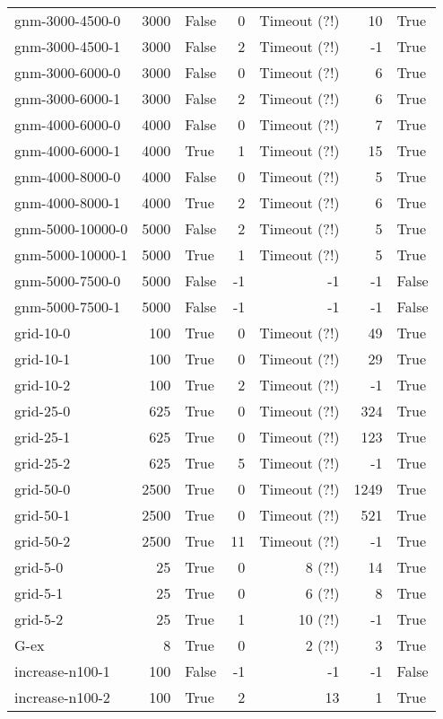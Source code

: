 \begin{longtable}{lrlrrrl}
gnm-3000-4500-0 & 3000 & False & 0 & Timeout (?!) & 10 & True \\
gnm-3000-4500-1 & 3000 & False & 2 & Timeout (?!) & -1 & True \\
gnm-3000-6000-0 & 3000 & False & 0 & Timeout (?!) & 6 & True \\
gnm-3000-6000-1 & 3000 & False & 2 & Timeout (?!) & 6 & True \\
gnm-4000-6000-0 & 4000 & False & 0 & Timeout (?!) & 7 & True \\
gnm-4000-6000-1 & 4000 & True & 1 & Timeout (?!) & 15 & True \\
gnm-4000-8000-0 & 4000 & False & 0 & Timeout (?!) & 5 & True \\
gnm-4000-8000-1 & 4000 & True & 2 & Timeout (?!) & 6 & True \\
gnm-5000-10000-0 & 5000 & False & 2 & Timeout (?!) & 5 & True \\
gnm-5000-10000-1 & 5000 & True & 1 & Timeout (?!) & 5 & True \\
gnm-5000-7500-0 & 5000 & False & -1 & -1 & -1 & False \\
gnm-5000-7500-1 & 5000 & False & -1 & -1 & -1 & False \\
grid-10-0 & 100 & True & 0 & Timeout (?!) & 49 & True \\
grid-10-1 & 100 & True & 0 & Timeout (?!) & 29 & True \\
grid-10-2 & 100 & True & 2 & Timeout (?!) & -1 & True \\
grid-25-0 & 625 & True & 0 & Timeout (?!) & 324 & True \\
grid-25-1 & 625 & True & 0 & Timeout (?!) & 123 & True \\
grid-25-2 & 625 & True & 5 & Timeout (?!) & -1 & True \\
grid-50-0 & 2500 & True & 0 & Timeout (?!) & 1249 & True \\
grid-50-1 & 2500 & True & 0 & Timeout (?!) & 521 & True \\
grid-50-2 & 2500 & True & 11 & Timeout (?!) & -1 & True \\
grid-5-0 & 25 & True & 0 & 8 (?!) & 14 & True \\
grid-5-1 & 25 & True & 0 & 6 (?!) & 8 & True \\
grid-5-2 & 25 & True & 1 & 10 (?!) & -1 & True \\
G-ex & 8 & True & 0 & 2 (?!) & 3 & True \\
increase-n100-1 & 100 & False & -1 & -1 & -1 & False \\
increase-n100-2 & 100 & True & 2 & 13 & 1 & True \\

\end{longtable}
